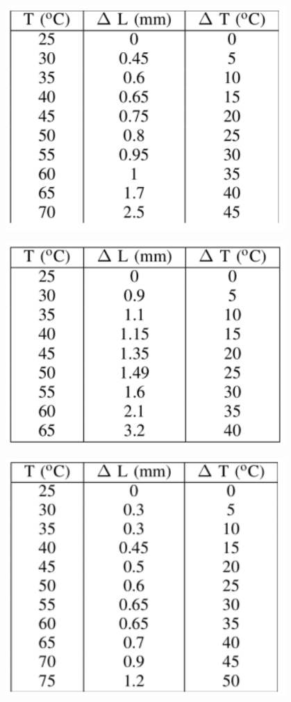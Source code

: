 \documentclass[DIV=calc, paper=a4, fontsize=11pt]{scrartcl}
\newenvironment{Figura}
  {\par\medskip\noindent\minipage{\linewidth}}
  {\endminipage\par\medskip}
\begin{document}
\begin{multicols}{2}
\begin{Figura}
\centering
    \includegraphics[width=0.8\textwidth]{tablas/tabla 1.PNG}
    \label{fig}
\end{Figura}

\begin{Figura}
\centering
    \includegraphics[width=0.8\textwidth]{tablas/tabla 2.PNG}
    \label{fig}
\end{Figura}

\begin{Figura}
\centering
    \includegraphics[width=0.8\textwidth]{tablas/tabla 3.PNG}
    \label{fig}
\end{Figura}


\end{multicols}
\end{document}
